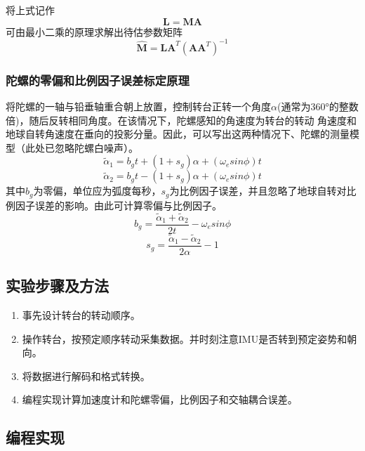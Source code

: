 \documentclass{ctexart}
\begin{document}
将上式记作
\begin{equation}
\mathbf{L}=\mathbf{MA}
\end{equation}
可由最小二乘的原理求解出待估参数矩阵
\begin{equation}
\hat{\mathbf{M}}=\mathbf{LA}^{T}\left(\mathbf{AA}^{T}\right)^{-1}
\label{eq:7}
\end{equation}

\subsubsection{陀螺的零偏和比例因子误差标定原理}
将陀螺的一轴与铅垂轴重合朝上放置，控制转台正转一个角度$\alpha$(通常为360°的整数倍)，随后反转相同角度。在该情况下，陀螺感知的角速度为转台的转动
角速度和地球自转角速度在垂向的投影分量。因此，可以写出这两种情况下、陀螺的测量模型（此处已忽略陀螺白噪声）。
\begin{equation}
\tilde{\alpha}_{1}=b_{g}t+\left(1+s_{g}\right)\alpha+\left(\omega_{e}sin\phi\right)t
\label{eq:8}
\end{equation}
\begin{equation}
\tilde{\alpha}_{2}=b_{g}t-\left(1+s_{g}\right)\alpha+\left(\omega_{e}sin\phi\right)t
\label{eq:9}
\end{equation}
其中$b_{g}$为零偏，单位应为弧度每秒，$s_{g}$为比例因子误差，并且忽略了地球自转对比例因子误差的影响。由此可计算零偏与比例因子。
\begin{equation}
b_{g}=\frac{\tilde{\alpha}_1+\tilde{\alpha}_2}{2t}-\omega_esin\phi
\label{eq:10}
\end{equation}
\begin{equation}
s_g=\frac{\tilde{\alpha}_1-\tilde{\alpha}_2}{2\alpha}-1
\label{eq:11}
\end{equation}

\subsection{ 实验步骤及方法}
\begin{enumerate}[(1)]
\item 事先设计转台的转动顺序。
\item 操作转台，按预定顺序转动采集数据。并时刻注意IMU是否转到预定姿势和朝向。
\item 将数据进行解码和格式转换。
\item 编程实现计算加速度计和陀螺零偏，比例因子和交轴耦合误差。
\end{enumerate}
\subsection{编程实现}
\end{document}
